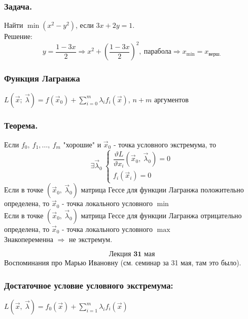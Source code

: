 \documentclass[12pt, letterpaper, twoside]{article}
\newcommand{\DS}{\displaystyle}
\begin{document}
    \subsubsection*{Задача.}
    Найти $\min(x^2  - y^2)$, если $3x + 2y = 1$.\\
    Решение:
    \[y = \frac{1 - 3x}{2}\Rightarrow x^2 + \left( \frac{1 - 3x}{2} \right)^2,\ \text{парабола}\Rightarrow x_{\min} = x_{\text{верш.}} \]
    \subsubsection*{Функция Лагранжа}
    $L(\vec{x};\ \vec{\lambda}) = f(\vec{x}_0) + \DS \sum_{i = 0}^{m}\lambda_i f_i(\vec{x})$, $n + m$ аргументов
    \subsubsection*{Теорема.}
    Если $f_0,\ f_1,\dots,\ f_m$ "хорошие" и $\vec{x}_0$ - точка условного экстремума, то
    \[\exists \vec{\lambda}_0\ \begin{cases}
        \dfrac{\vartheta L}{\vartheta x_i}(\vec{x}_0,\ \vec{\lambda}_0) = 0\\
        f_i (\vec{x}_i) = 0
    \end{cases}\]
    Если в точке $(\vec{x}_0,\ \vec{\lambda}_0)$ матрица Гессе для функции Лагранжа положительно определена, то $\vec{x}_0$ - точка локального условного $\min$\\
    Если в точке $(\vec{x}_0,\ \vec{\lambda}_0)$ матрица Гессе для функции Лагранжа отрицательно определена, то $\vec{x}_0$ - точка локального условного $\max$\\
    Знакопеременна $\Rightarrow$ не экстремум.    

\[\textbf{Лекция 31 мая}\]
    Воспоминания про Марью Ивановну (см. семинар за 31 мая, там это было).
    \subsubsection*{Достаточное условие условного экстремума:}
    $L(\vec{x},\ \vec{\lambda}) = f_0(\vec{x}) + \DS\sum_{i = 1}^{m} \lambda_i f_i (\vec{x})$\\
\end{document}
